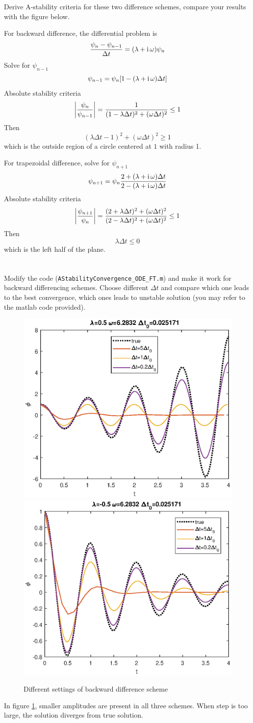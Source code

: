 \subsection{}
Derive A-stability criteria for these two difference schemes, compare your results with the figure below.

For backward difference, the differential problem is
\[ \frac{\psi_n-\psi_{n-1}}{\Delta t} = (\lambda + \operatorname{\mathrm{i}}\omega)\psi_n \]
Solve for $\psi_{n-1}$
\[ \psi_{n-1} = \psi_n[1 - (\lambda + \operatorname{\mathrm{i}}\omega)\Delta t] \]
Absolute stability criteria
\[ \abs{\frac{\psi_n}{\psi_{n-1}}} = \frac1{(1-\lambda\Delta t)^2 + (\omega\Delta t)^2} \le 1 \]
Then
\[ (\lambda\Delta t - 1)^2 + (\omega\Delta t)^2 \ge 1 \]
which is the outside region of a circle centered at $1$ with radius 1.

For trapezoidal difference, solve for $\psi_{n+1}$
\[ \psi_{n+1} = \psi_n\frac{2 + (\lambda + \operatorname{\mathrm{i}}\omega)\Delta t}{2 - (\lambda + \operatorname{\mathrm{i}}\omega)\Delta t} \]
Absolute stability criteria
\[ \abs{\frac{\psi_{n+1}}{\psi_n}} = \frac{(2+\lambda\Delta t)^2 + (\omega\Delta t)^2}{(2-\lambda\Delta t)^2 + (\omega\Delta t)^2} \le 1 \]
Then
\[ \lambda\Delta t \le 0 \]
which is the left half of the plane.

\section{}
Modify the code (\verb|AStabilityConvergence_ODE_FT.m|) and make it work for backward differencing schemes. Choose different $\Delta t$ and compare which one leads to the best convergence, which ones leads to unstable solution (you may refer to the matlab code provided).

\begin{figure}[!htbp]
    \includegraphics[width=0.45\linewidth]{hw1/backward_1}
    \includegraphics[width=0.45\linewidth]{hw1/backward_2}
    \caption{Different settings of backward difference scheme}
    \label{fig:backward}
\end{figure}
In figure \ref{fig:backward}, smaller amplitudes are present in all three schemes. When step is too large, the solution diverges from true solution.

